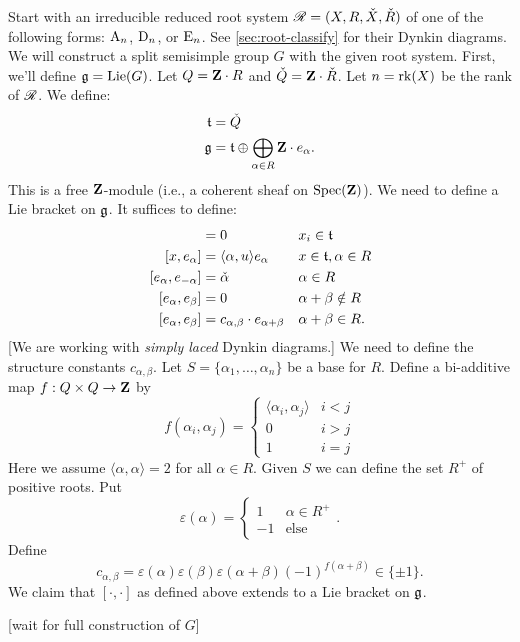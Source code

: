 Start with an irreducible reduced root system $\mathscr{R}=(X,R,\check X,\check R)$ of 
one of the following forms: $\mathrm{A}_n$, $\mathrm{D}_n$, or $\mathrm{E}_n$. See 
\autoref{sec:root-classify} for their Dynkin diagrams. We will construct a 
split semisimple group $G$ with the given root system. First, we'll define 
$\mathfrak{g}=\operatorname{Lie}(G)$. Let $Q=\mathbf{Z}\cdot R$ and $\check Q=\mathbf{Z}\cdot \check R$. Let 
$n=\operatorname{rk}(X)$ be the rank of $\mathscr{R}$. We define: 
\begin{align*}
  \mathfrak{t} &= \check Q \\
  \mathfrak{g} &= \mathfrak{t}\oplus \bigoplus_{\alpha\in R} \mathbf{Z}\cdot e_\alpha .
\end{align*}
This is a free $\mathbf{Z}$-module (i.e., a coherent sheaf on $\operatorname{Spec}(\mathbf{Z})$). We 
need to define a Lie bracket on $\mathfrak{g}$. It suffices to define: 
\begin{align*}
  [x_1,x_2] &= 0 && x_i\in \ft \\
  [x,e_\alpha] &= \langle \alpha,u\rangle e_\alpha && x\in \ft, \alpha\in R \\
  [e_\alpha,e_{-\alpha}] &= \check\alpha && \alpha\in R \\
  [e_\alpha,e_\beta] &= 0 && \alpha+\beta\notin R \\
  [e_\alpha,e_\beta] &= c_{\alpha,\beta} \cdot e_{\alpha+\beta} && \alpha+\beta\in R .
\end{align*}
[We are working with \emph{simply laced} Dynkin diagrams.] We need to define 
the structure constants $c_{\alpha,\beta}$. Let $S=\{\alpha_1,\dots,\alpha_n\}$ 
be a base for $R$. Define a bi-additive map $f:Q\times Q\to \mathbf{Z}$ by 
\[
  f(\alpha_i,\alpha_j) = \begin{cases} \langle \alpha_i,\alpha_j\rangle & i<j \\ 0 & i>j \\ 1 & i=j \end{cases} 
\]
Here we assume $\langle\alpha,\alpha\rangle=2$ for all $\alpha\in R$. Given $S$ 
we can define the set $R^+$ of positive roots. Put 
\[
  \varepsilon(\alpha) = \begin{cases} 1 & \alpha\in R^+ \\ -1 & \text{else} \end{cases} .
\]
Define 
\[
  c_{\alpha,\beta} = \varepsilon(\alpha)\varepsilon(\beta) \varepsilon(\alpha+\beta) (-1)^{f(\alpha+\beta)}\in \{\pm 1\} .
\]
We claim that $[\cdot,\cdot]$ as defined above extends to a Lie bracket on 
$\mathfrak{g}$. 

[wait for full construction of $G$]




